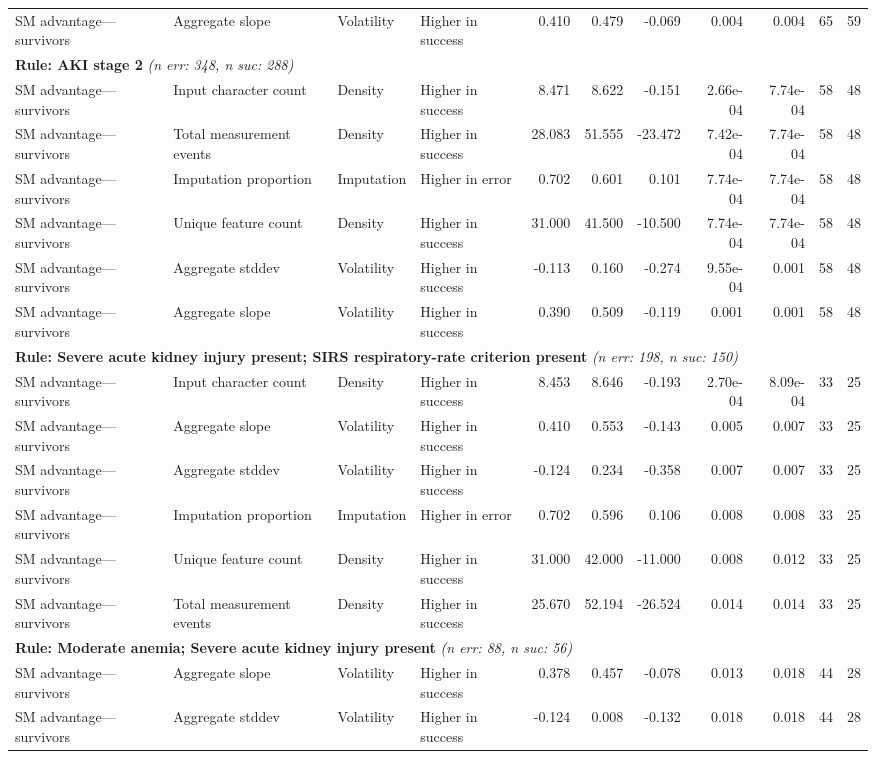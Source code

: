 \documentclass[border=0pt]{standalone}
\begin{document}
\begin{adjustbox}{width=\textwidth}
\begin{tabular}{@{}llllrrrrrrr@{}}
SM advantage—survivors & Aggregate slope & Volatility & Higher in success & 0.410 & 0.479 & -0.069 & 0.004 & 0.004 & 65 & 59 \\
\multicolumn{11}{l}{\textbf{Rule: AKI stage 2} \textit{(n err: 348, n suc: 288)}} \\
SM advantage—survivors & Input character count & Density & Higher in success & 8.471 & 8.622 & -0.151 & 2.66e-04 & 7.74e-04 & 58 & 48 \\
SM advantage—survivors & Total measurement events & Density & Higher in success & 28.083 & 51.555 & -23.472 & 7.42e-04 & 7.74e-04 & 58 & 48 \\
SM advantage—survivors & Imputation proportion & Imputation & Higher in error & 0.702 & 0.601 & 0.101 & 7.74e-04 & 7.74e-04 & 58 & 48 \\
SM advantage—survivors & Unique feature count & Density & Higher in success & 31.000 & 41.500 & -10.500 & 7.74e-04 & 7.74e-04 & 58 & 48 \\
SM advantage—survivors & Aggregate stddev & Volatility & Higher in success & -0.113 & 0.160 & -0.274 & 9.55e-04 & 0.001 & 58 & 48 \\
SM advantage—survivors & Aggregate slope & Volatility & Higher in success & 0.390 & 0.509 & -0.119 & 0.001 & 0.001 & 58 & 48 \\
\multicolumn{11}{l}{\textbf{Rule: Severe acute kidney injury present; SIRS respiratory-rate criterion present} \textit{(n err: 198, n suc: 150)}} \\
SM advantage—survivors & Input character count & Density & Higher in success & 8.453 & 8.646 & -0.193 & 2.70e-04 & 8.09e-04 & 33 & 25 \\
SM advantage—survivors & Aggregate slope & Volatility & Higher in success & 0.410 & 0.553 & -0.143 & 0.005 & 0.007 & 33 & 25 \\
SM advantage—survivors & Aggregate stddev & Volatility & Higher in success & -0.124 & 0.234 & -0.358 & 0.007 & 0.007 & 33 & 25 \\
SM advantage—survivors & Imputation proportion & Imputation & Higher in error & 0.702 & 0.596 & 0.106 & 0.008 & 0.008 & 33 & 25 \\
SM advantage—survivors & Unique feature count & Density & Higher in success & 31.000 & 42.000 & -11.000 & 0.008 & 0.012 & 33 & 25 \\
SM advantage—survivors & Total measurement events & Density & Higher in success & 25.670 & 52.194 & -26.524 & 0.014 & 0.014 & 33 & 25 \\
\multicolumn{11}{l}{\textbf{Rule: Moderate anemia; Severe acute kidney injury present} \textit{(n err: 88, n suc: 56)}} \\
SM advantage—survivors & Aggregate slope & Volatility & Higher in success & 0.378 & 0.457 & -0.078 & 0.013 & 0.018 & 44 & 28 \\
SM advantage—survivors & Aggregate stddev & Volatility & Higher in success & -0.124 & 0.008 & -0.132 & 0.018 & 0.018 & 44 & 28 \\
\bottomrule
\end{tabular}
\end{adjustbox}
\end{document}
